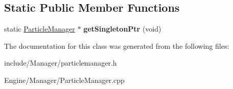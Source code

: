 \subsection*{Static Public Member Functions}
\begin{DoxyCompactItemize}
\item 
\hypertarget{classEngine_1_1ParticleManager_aef6ab3d8b2184bc87ae179625b532546}{}static \hyperlink{classEngine_1_1ParticleManager}{Particle\+Manager} $\ast$ {\bfseries get\+Singleton\+Ptr} (void)\label{classEngine_1_1ParticleManager_aef6ab3d8b2184bc87ae179625b532546}

\end{DoxyCompactItemize}


The documentation for this class was generated from the following files\+:\begin{DoxyCompactItemize}
\item 
include/\+Manager/particlemanager.\+h\item 
Engine/\+Manager/Particle\+Manager.\+cpp\end{DoxyCompactItemize}
